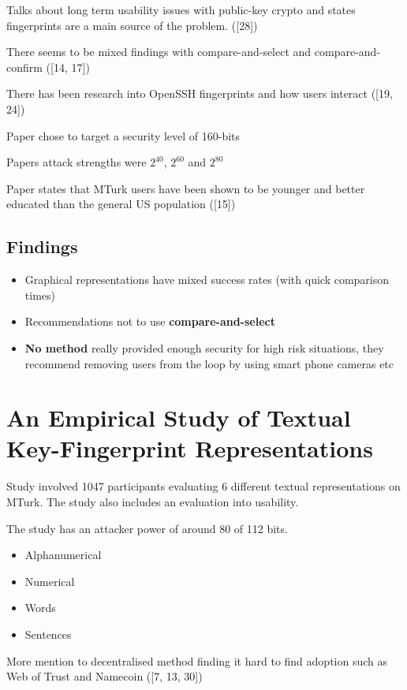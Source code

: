 Talks about long term usability issues with public-key crypto and states fingerprints are a main source of the problem. ([28])

There seems to be mixed findings with compare-and-select and compare-and-confirm ([14, 17])

There has been research into OpenSSH fingerprints and how users interact ([19, 24])

Paper chose to target a security level of 160-bits

Papers attack strengths were $2^{40}$, $2^{60}$ and $2^{80}$

Paper states that MTurk users have been shown to be younger and better educated than the general US population ([15])

\subsection{Findings}

\begin{itemize}
    \item Graphical representations have mixed success rates (with quick comparison times)
    \item Recommendations not to use \textbf{compare-and-select}
    \item \textbf{No method} really provided enough security for high risk situations, they recommend removing users from the loop by using smart phone cameras etc
\end{itemize}

\newpage
\section{An Empirical Study of Textual Key-Fingerprint Representations}

Study involved 1047 participants evaluating 6 different textual representations on MTurk. The study also includes an evaluation into usability.

The study has an attacker power of around 80 of 112 bits.

\begin{itemize}
    \item Alphanumerical
    \item Numerical
    \item Words
    \item Sentences
\end{itemize}

More mention to decentralised method finding it hard to find adoption such as Web of Trust and Namecoin ([7, 13, 30])

